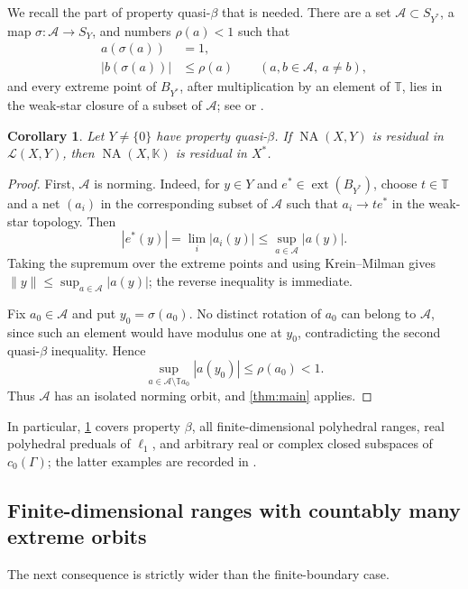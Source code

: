 \documentclass[11pt]{article}
\newtheorem{corollary}[theorem]{Corollary}
\theoremstyle{definition}
\theoremstyle{remark}
\newcommand{\K}{\mathbb K}
\newcommand{\T}{\mathbb T}
\newcommand{\NA}{\operatorname{NA}}
\newcommand{\calL}{\mathcal L}
\newcommand{\ext}{\operatorname{ext}}
\newcommand{\norm}[1]{\lVert #1\rVert}
\newcommand{\Sphere}{S}
\begin{document}
We recall the part of property quasi-$\beta$ that is needed.  There are a set
$\mathcal A\subset\Sphere_{Y^*}$, a map
$\sigma:\mathcal A\to\Sphere_Y$, and numbers $\rho(a)<1$ such that
\begin{align*}
 a(\sigma(a))&=1,\\
 |b(\sigma(a))|&\le\rho(a)\qquad(a,b\in\mathcal A,\ a\ne b),
\end{align*}
and every extreme point of $B_{Y^*}$, after multiplication by an element of $\T$, lies in the weak-star closure of a subset of $\mathcal A$; see \cite{AAP} or \cite[Section~3.1]{JMRZ}.

\begin{corollary}\label{cor:quasibeta}
Let $Y\ne\{0\}$ have property quasi-$\beta$.  If $\NA(X,Y)$ is residual in $\calL(X,Y)$, then $\NA(X,\K)$ is residual in $X^*$.
\end{corollary}

\begin{proof}
First, $\mathcal A$ is norming.  Indeed, for $y\in Y$ and
$e^*\in\ext(B_{Y^*})$, choose $t\in\T$ and a net $(a_i)$ in the corresponding subset of $\mathcal A$ such that $a_i\to te^*$ in the weak-star topology.  Then
\[
 |e^*(y)|=\lim_i|a_i(y)|
 \le\sup_{a\in\mathcal A}|a(y)|.
\]
Taking the supremum over the extreme points and using Krein--Milman gives
$\norm y\le\sup_{a\in\mathcal A}|a(y)|$; the reverse inequality is immediate.

Fix $a_0\in\mathcal A$ and put $y_0=\sigma(a_0)$.  No distinct rotation of $a_0$ can belong to $\mathcal A$, since such an element would have modulus one at $y_0$, contradicting the second quasi-$\beta$ inequality.  Hence
\[
 \sup_{a\in\mathcal A\setminus\T a_0}|a(y_0)|
 \le\rho(a_0)<1.
\]
Thus $\mathcal A$ has an isolated norming orbit, and \cref{thm:main} applies.
\end{proof}

In particular, \cref{cor:quasibeta} covers property $\beta$, all finite-dimensional polyhedral ranges, real polyhedral preduals of $\ell_1$, and arbitrary real or complex closed subspaces of $c_0(\Gamma)$; the latter examples are recorded in \cite[Example~3.2]{JMRZ}.

\subsection{Finite-dimensional ranges with countably many extreme orbits}

The next consequence is strictly wider than the finite-boundary case.
\end{document}

